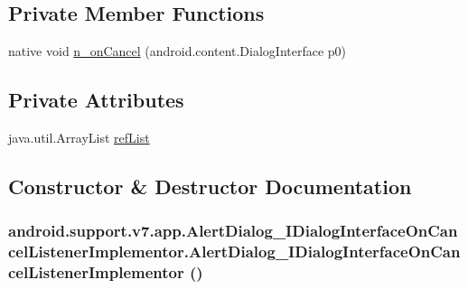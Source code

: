 \subsection*{Private Member Functions}
\begin{CompactItemize}
\item 
native void \hyperlink{classandroid_1_1support_1_1v7_1_1app_1_1_alert_dialog___i_dialog_interface_on_cancel_listener_implementor_82ff725c96bbf1e41c9d344fec4f5e6e}{n\_\-onCancel} (android.content.DialogInterface p0)
\end{CompactItemize}
\subsection*{Private Attributes}
\begin{CompactItemize}
\item 
java.util.ArrayList \hyperlink{classandroid_1_1support_1_1v7_1_1app_1_1_alert_dialog___i_dialog_interface_on_cancel_listener_implementor_8218b03a462abb0277f01ff09099d912}{refList}
\end{CompactItemize}


\subsection{Constructor \& Destructor Documentation}
\hypertarget{classandroid_1_1support_1_1v7_1_1app_1_1_alert_dialog___i_dialog_interface_on_cancel_listener_implementor_f5572df93ae67ee462dd68692aa7ac92}{
\subsubsection[{AlertDialog\_\-IDialogInterfaceOnCancelListenerImplementor}]{\setlength{\rightskip}{0pt plus 5cm}android.support.v7.app.AlertDialog\_\-IDialogInterfaceOnCancelListenerImplementor.AlertDialog\_\-IDialogInterfaceOnCancelListenerImplementor ()}}
\label{classandroid_1_1support_1_1v7_1_1app_1_1_alert_dialog___i_dialog_interface_on_cancel_listener_implementor_f5572df93ae67ee462dd68692aa7ac92}




